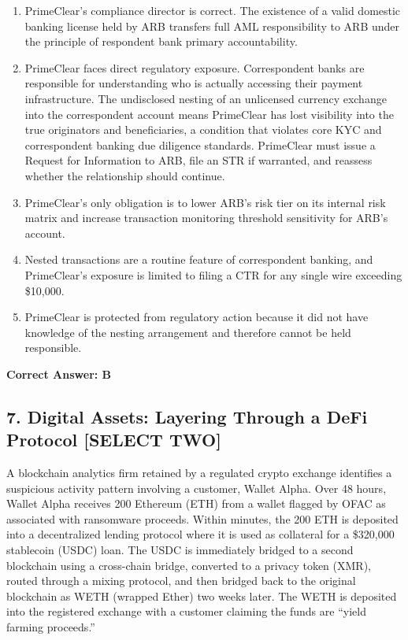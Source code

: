 \documentclass[11pt,a4paper]{article}
\begin{document}
	\begin{enumerate}[label=\Alph*.]
		\item PrimeClear's compliance director is correct. The existence of a valid domestic banking license held by ARB transfers full AML responsibility to ARB under the principle of respondent bank primary accountability.
		\item PrimeClear faces direct regulatory exposure. Correspondent banks are responsible for understanding who is actually accessing their payment infrastructure. The undisclosed nesting of an unlicensed currency exchange into the correspondent account means PrimeClear has lost visibility into the true originators and beneficiaries, a condition that violates core KYC and correspondent banking due diligence standards. PrimeClear must issue a Request for Information to ARB, file an STR if warranted, and reassess whether the relationship should continue.
		\item PrimeClear's only obligation is to lower ARB's risk tier on its internal risk matrix and increase transaction monitoring threshold sensitivity for ARB's account.
		\item Nested transactions are a routine feature of correspondent banking, and PrimeClear's exposure is limited to filing a CTR for any single wire exceeding \$10,000.
		\item PrimeClear is protected from regulatory action because it did not have knowledge of the nesting arrangement and therefore cannot be held responsible.
	\end{enumerate}
	\textbf{Correct Answer: B}
	
	\subsection{7. Digital Assets: Layering Through a DeFi Protocol \textnormal{[SELECT TWO]}}
	
	A blockchain analytics firm retained by a regulated crypto exchange identifies a suspicious activity pattern involving a customer, Wallet Alpha. Over 48 hours, Wallet Alpha receives 200 Ethereum (ETH) from a wallet flagged by OFAC as associated with ransomware proceeds. Within minutes, the 200 ETH is deposited into a decentralized lending protocol where it is used as collateral for a \$320,000 stablecoin (USDC) loan. The USDC is immediately bridged to a second blockchain using a cross-chain bridge, converted to a privacy token (XMR), routed through a mixing protocol, and then bridged back to the original blockchain as WETH (wrapped Ether) two weeks later. The WETH is deposited into the registered exchange with a customer claiming the funds are ``yield farming proceeds.''
	
\end{document}
